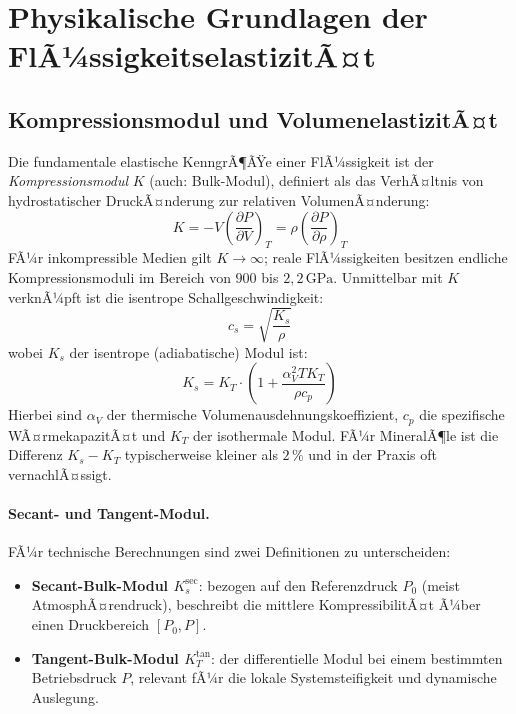 ﻿\documentclass[a4paper,12pt]{scrreprt}
\theoremstyle{definition}
\begin{document}
\section{Physikalische Grundlagen der FlÃ¼ssigkeitselastizitÃ¤t}

\subsection{Kompressionsmodul und VolumenelastizitÃ¤t}

Die fundamentale elastische KenngrÃ¶ÃŸe einer FlÃ¼ssigkeit ist der
\emph{Kompressionsmodul} $K$ (auch: Bulk-Modul), definiert als das VerhÃ¤ltnis
von hydrostatischer DruckÃ¤nderung zur relativen VolumenÃ¤nderung:
\begin{equation}
  K = -V \left(\frac{\partial P}{\partial V}\right)_T
    = \rho \left(\frac{\partial P}{\partial \rho}\right)_T
  \label{eq:bulk_modul}
\end{equation}
FÃ¼r inkompressible Medien gilt $K \to \infty$; reale FlÃ¼ssigkeiten besitzen
endliche Kompressionsmoduli im Bereich von $900$ bis $2{,}2\,\mathrm{GPa}$.
Unmittelbar mit $K$ verknÃ¼pft ist die isentrope Schallgeschwindigkeit:
\begin{equation}
  c_s = \sqrt{\frac{K_s}{\rho}}
  \label{eq:schallgeschw}
\end{equation}
wobei $K_s$ der isentrope (adiabatische) Modul ist:
\begin{equation}
  K_s = K_T \cdot \left(1 + \frac{\alpha_V^2 T K_T}{\rho c_p}\right)
  \label{eq:ks_kt}
\end{equation}
Hierbei sind $\alpha_V$ der thermische Volumenausdehnungskoeffizient,
$c_p$ die spezifische WÃ¤rmekapazitÃ¤t und $K_T$ der isothermale Modul.
FÃ¼r MineralÃ¶le ist die Differenz $K_s - K_T$ typischerweise kleiner als
$2\,\%$ und in der Praxis oft vernachlÃ¤ssigt.

\paragraph{Secant- und Tangent-Modul.}
FÃ¼r technische Berechnungen sind zwei Definitionen zu unterscheiden:
\begin{itemize}
  \item \textbf{Secant-Bulk-Modul $K_s^{\mathrm{sec}}$}: bezogen auf den
    Referenzdruck $P_0$ (meist AtmosphÃ¤rendruck), beschreibt die mittlere
    KompressibilitÃ¤t Ã¼ber einen Druckbereich $[P_0, P]$.
  \item \textbf{Tangent-Bulk-Modul $K_T^{\mathrm{tan}}$}: der differentielle
    Modul bei einem bestimmten Betriebsdruck $P$, relevant fÃ¼r die lokale
    Systemsteifigkeit und dynamische Auslegung.
\end{itemize}
\end{document}
